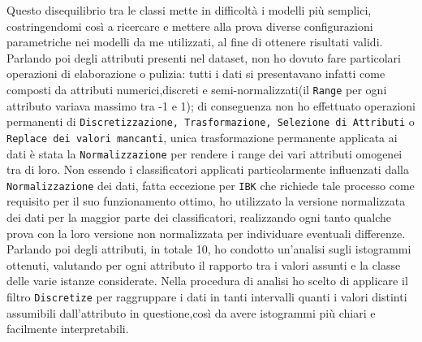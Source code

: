 Questo disequilibrio tra le classi mette in difficoltà i modelli più semplici, costringendomi così a ricercare e mettere alla prova diverse configurazioni parametriche nei modelli da me utilizzati, al fine di ottenere risultati validi.
Parlando poi degli attributi presenti nel dataset, non ho dovuto fare particolari operazioni di elaborazione o pulizia: tutti i dati si presentavano infatti come composti da attributi numerici,discreti e semi-normalizzati(il \texttt{Range} per ogni attributo variava massimo tra -1 e 1); di conseguenza non ho effettuato operazioni permanenti di \texttt{Discretizzazione, Trasformazione, Selezione di Attributi} o \texttt{Replace dei valori mancanti}, unica trasformazione permanente applicata ai dati è stata la \texttt{Normalizzazione} per rendere i range dei vari attributi omogenei tra di loro.
Non essendo i classificatori applicati particolarmente influenzati dalla \texttt{Normalizzazione} dei dati, fatta eccezione per \texttt{IBK} che richiede tale processo come requisito per il suo funzionamento ottimo, ho utilizzato la versione normalizzata dei dati per la maggior parte dei classificatori, realizzando ogni tanto qualche prova con la loro versione non normalizzata per individuare eventuali differenze.\\
Parlando poi degli attributi, in totale 10, ho condotto un'analisi sugli istogrammi ottenuti, valutando per ogni attributo il rapporto tra i valori assunti e la classe delle varie istanze considerate.
Nella procedura di analisi ho scelto di applicare il filtro \texttt{Discretize} per raggruppare i dati in tanti intervalli quanti i valori distinti assumibili dall'attributo in questione,così da avere istogrammi più chiari e facilmente interpretabili.

